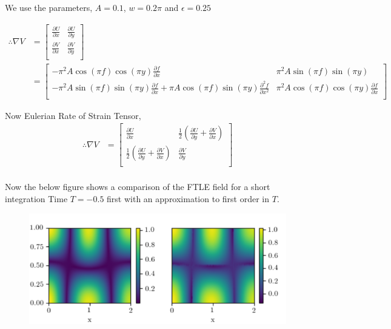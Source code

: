\documentclass[../report.tex]{subfiles}
\begin{document}
We use the parameters, \(A = 0.1\), \(w = 0.2\pi\) and \(\epsilon = 0.25\)

\begin{equation}
  \begin{aligned}
    \therefore \nabla V &= \begin{bmatrix}
      \frac{\partial U}{\partial x} & \frac{\partial U}{\partial y} \\[12pt]
      \frac{\partial V}{\partial x} & \frac{\partial V}{\partial y} \\
    \end{bmatrix} \\
    &= \begin{bmatrix}
      -\pi^2 A\cos(\pi f)\cos(\pi y) \frac{\partial f}{\partial x} & \pi^2 A\sin(\pi f)\sin(\pi y) \\[12pt]
      -\pi^2 A\sin(\pi f)\sin(\pi y)\frac{\partial f}{\partial x} + \pi A\cos(\pi f)\sin(\pi y) \frac{\partial^2 f}{\partial x^2} & \pi^2 A\cos(\pi f)\cos(\pi y)\frac{\partial f}{\partial x} \\
    \end{bmatrix}
  \end{aligned}
\end{equation}

Now Eulerian Rate of Strain Tensor,
\begin{equation}
  \begin{aligned}
    \therefore \nabla V &= \begin{bmatrix}
      \frac{\partial U}{\partial x} & \frac{1}{2} (\frac{\partial U}{\partial y} + \frac{\partial V}{\partial x}) \\[12pt]
      \frac{1}{2} (\frac{\partial U}{\partial y} + \frac{\partial V}{\partial x}) & \frac{\partial V}{\partial y} \\
    \end{bmatrix} \\
  \end{aligned}
\end{equation}

Now the below figure shows a comparison of the FTLE field for a short integration Time \(T = -0.5\) first with an approximation to first order in \(T\).

\begin{figure}[H]
  \centering
  \includegraphics[width=\linewidth]{images/figure6.png}
  \caption{}
\end{figure}
\end{document}
